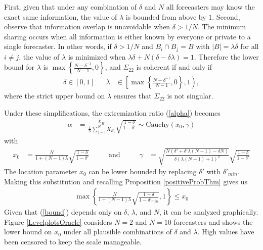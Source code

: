 \documentclass[11pt]{article}
\theoremstyle{definition}
\theoremstyle{definition}
\begin{document}
First, given that under any combination of $\delta$ and $N$ all
forecasters may know the exact same information, the value of
$\lambda$ is bounded from above by $1$. Second, observe that
information overlap is unavoidable when $\delta > 1/N$.  The minimum
sharing occurs when all information is either known by everyone or
private to a single forecaster.  In other words, if $\delta > 1/N$ and
$B_{i} \cap B_j = B$ with $|B| = \lambda \delta$ for all $i \neq j$,
the value of $\lambda$ is minimized when $\lambda\delta + N(\delta -
\delta\lambda) = 1$.  Therefore the lower bound for $\lambda$ is $\max
\left\{ \frac{N-\delta^{-1}}{N-1}, 0\right\}$, and $\Sigma_{22}$ is
coherent if and only if
\begin{align}
\delta \in [0,1] &&  \lambda &\in \left[  
   \max \left\{ \frac{N-\delta^{-1}}{N-1}, 0\right\}, 1 \right), 
   \label{rhoDomain}
\end{align}
where the strict upper bound on $\lambda$ ensures that
$\Sigma_{22}$ is not singular.  

Under these simplifications, the extremization ratio (\ref{alpha})
becomes
\begin{align*}
\alpha &= \frac{X_{B'}}{\frac{1}{N}\sum_{j=1}^N X_{B_j}} \sqrt{\frac{1-\delta}{1-\delta'}} \sim \text{Cauchy}(x_0, \gamma)
\end{align*}
 with
\begin{align*}
x_0 &= \frac{N}{1+(N-1)\lambda}  \sqrt{\frac{1-\delta}{1-\delta'}} &&& \text{ and } &&& \gamma &=  \sqrt{\frac{N(\delta' + \delta' \lambda (N-1) - \delta N)}{\delta (\lambda (N-1) + 1)^2}}\sqrt{\frac{1-\delta}{1-\delta'}}
\end{align*}
The location parameter $x_0$ can be lower bounded by replacing
$\delta'$ with $\delta'_{min}$. Making this substitution and recalling
Proposition \ref{positiveProbThm} gives us
\begin{align}
\max\left\{ \frac{N}{1+(N-1)\lambda}  \sqrt{\frac{1-\delta}{1-\delta'_{min}}}, 1 \right\} \leq x_0 \label{bound}
\end{align}
Given that (\ref{bound}) depends only on $\delta$, $\lambda$, and $N$, it can be analyzed graphically. Figure \ref{LevelplotsOracle} considers $N=2$ and $N = 10$ forecasters and shows the lower bound on $x_0$ under all plausible combinations of $\delta$ and $\lambda$. High values have been censored to keep the scale manageable. 
\end{document}
